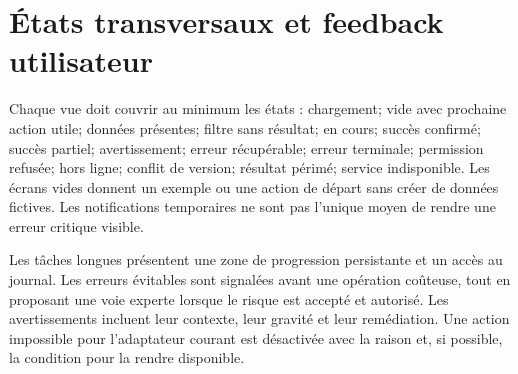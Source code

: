 \documentclass[11pt,a4paper]{article}
\begin{document}
\section{États transversaux et feedback utilisateur}
Chaque vue doit couvrir au minimum les états : chargement; vide avec prochaine action utile; données présentes; filtre sans résultat; en cours; succès confirmé; succès partiel; avertissement; erreur récupérable; erreur terminale; permission refusée; hors ligne; conflit de version; résultat périmé; service indisponible. Les écrans vides donnent un exemple ou une action de départ sans créer de données fictives. Les notifications temporaires ne sont pas l'unique moyen de rendre une erreur critique visible.

Les tâches longues présentent une zone de progression persistante et un accès au journal. Les erreurs évitables sont signalées avant une opération coûteuse, tout en proposant une voie experte lorsque le risque est accepté et autorisé. Les avertissements incluent leur contexte, leur gravité et leur remédiation. Une action impossible pour l'adaptateur courant est désactivée avec la raison et, si possible, la condition pour la rendre disponible.
\end{document}
